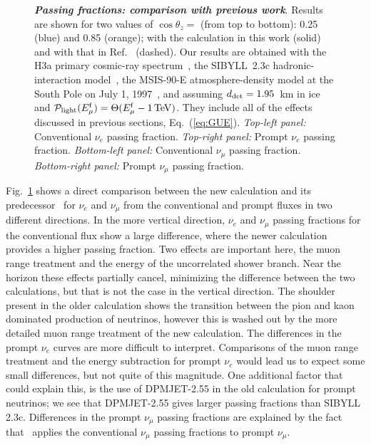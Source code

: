 \begin{figure}
{	}
	\caption{\textbf{\textit{Passing fractions: comparison with previous work}}. Results are shown for two values of $\cos\theta_z =$ (from top to bottom): 0.25 (blue) and 0.85 (orange); with the calculation in this work (solid) and with that in Ref.~\cite{Gaisser:2014bja} (dashed). Our results are obtained with the H3a primary cosmic-ray spectrum~\cite{Gaisser:2011cc}, the SIBYLL~2.3c hadronic-interaction model~\cite{Riehn:2017mfm}, the MSIS-90-E atmosphere-density model at the South Pole on July 1, 1997~\cite{Labitzke:1985, Hedin:1991}, and assuming $d_{\rm det} = 1.95$~km in ice and ${\cal P}_{\rm light}(E_{\mu}^{\rm f}) = \Theta(E_{\mu}^{\rm f} - 1\,{\rm TeV})$. They include all of the effects discussed in previous sections, Eq.~(\ref{eq:GUE}). \textit{Top-left panel:} Conventional $\nu_e$ passing fraction. \textit{Top-right panel:} Prompt $\nu_e$ passing fraction. \textit{Bottom-left panel:} Conventional $\nu_\mu$ passing fraction. \textit{Bottom-right panel:} Prompt $\nu_\mu$ passing fraction.}
	\label{fig:nue-passing-comparison-old}
\end{figure}

Fig.~\ref{fig:nue-passing-comparison-old} shows a direct comparison between the new calculation and its predecessor~\cite{Gaisser:2014bja} for $\nu_e$ and $\nu_\mu$ from the conventional and prompt fluxes in two different directions.
In the more vertical direction, $\nu_e$ and $\nu_\mu$ passing fractions for the conventional flux show a large difference, where the newer calculation provides a higher passing fraction.
Two effects are important here, the muon range treatment and the energy of the uncorrelated shower branch.
Near the horizon these effects partially cancel, minimizing the difference between the two calculations, but that is not the case in the vertical direction.
The shoulder present in the older calculation shows the transition between the pion and kaon dominated production of neutrinos, however this is washed out by the more detailed muon range treatment of the new calculation.
The differences in the prompt $\nu_e$ curves are more difficult to interpret.
Comparisons of the muon range treatment and the energy subtraction for prompt $\nu_e$ would lead us to expect some small differences, but not quite of this magnitude.
One additional factor that could explain this, is the use of DPMJET-2.55 in the old calculation for prompt neutrinos; we see that DPMJET-2.55 gives larger passing fractions than SIBYLL 2.3c.
Differences in the prompt $\nu_\mu$ passing fractions are explained by the fact that~\cite{Gaisser:2014bja} applies the conventional $\nu_\mu$ passing fractions to prompt $\nu_\mu$.

